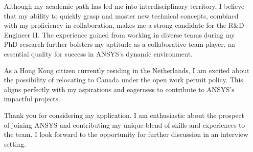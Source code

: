 \documentclass[11pt, a4paper]{awesome-cv}
\begin{document}
\begin{cvletter}
Although my academic path has led me into interdisciplinary territory, I believe that my ability to quickly grasp and master new technical concepts, combined with my proficiency in collaboration, makes me a strong candidate for the R\&D Engineer II. The experience gained from working in diverse teams during my PhD research further bolsters my aptitude as a collaborative team player, an essential quality for success in ANSYS's dynamic environment.

As a Hong Kong citizen currently residing in the Netherlands, I am excited about the possibility of relocating to Canada under the open work permit policy. This aligns perfectly with my aspirations and eagerness to contribute to ANSYS's impactful projects.

Thank you for considering my application. I am enthusiastic about the prospect of joining ANSYS and contributing my unique blend of skills and experiences to the team. I look forward to the opportunity for further discussion in an interview setting.


\end{cvletter}


\makeletterclosing
\end{document}
